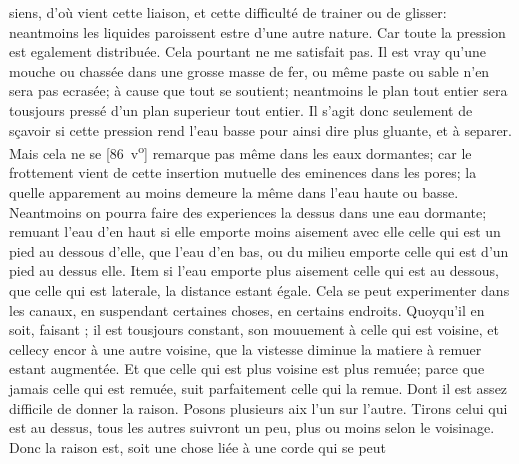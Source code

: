 siens, d'o\`{u} vient cette liaison, et cette difficulté de trainer ou de glisser: neantmoins les liquides paroissent estre d'une autre nature. Car toute la pression\protect{} est egalement distribuée. Cela pourtant ne me satisfait pas. Il est vray qu'une mouche ou chassée dans une grosse masse de fer, ou m\^{e}me paste ou sable n'en sera pas ecrasée; à cause que tout se soutient; neantmoins le plan tout entier sera tousjours pressé d'un plan superieur tout entier. Il s'agit donc seulement de s\c{c}avoir si cette pression\protect{} rend l'eau basse pour ainsi dire plus gluante, et 
 à separer. Mais cela ne se
[86~v\textsuperscript{o}]
remarque pas m\^{e}me  dans les eaux dormantes; car le frottement\protect{} vient de cette insertion mutuelle des eminences dans les pores; la quelle  apparement au moins demeure la m\^{e}me  dans l'eau haute ou basse. Neantmoins on pourra faire des experiences la dessus dans une  eau dormante; remuant l'eau d'en haut si elle emporte moins aisement avec elle celle qui est un pied au dessous d'elle, que l'eau d'en  bas, ou du milieu emporte celle qui est d'un pied au dessus elle. Item si l'eau emporte plus aisement celle qui est au dessous, que celle qui est  laterale, la distance estant \'{e}gale. Cela se peut experimenter dans les canaux, en suspendant certaines choses, en certains endroits. Quoyqu'il en  soit, faisant ; il est tousjours constant,   son mouuement \`{a} celle qui est voisine, et cellecy encor \`{a} une autre voisine, que la vistesse diminue la matiere \`{a} remuer  estant augment\'{e}e. Et que celle qui est plus voisine est plus remu\'{e}e; parce que jamais celle qui est remu\'{e}e, suit parfaitement celle qui la  remue. Dont il est assez difficile de donner la raison. Posons plusieurs aix\protect{} l'un sur l'autre. Tirons celui qui est au dessus, tous les autres suivront un peu,  plus ou moins selon le voisinage. Donc la raison est, soit une chose li\'{e}e \`{a} une corde\protect{} qui se peut 
